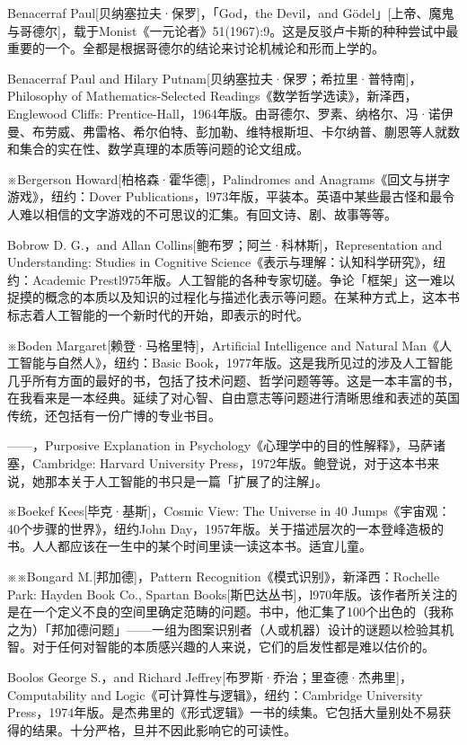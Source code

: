 \documentclass[
  12pt,
  twoside,
  openright,
  oldfontcommands,
]{memoir}
\begin{document}
Benacerraf Paul{[}贝纳塞拉夫·保罗{]}，「God，the Devil，and
Gödel」{[}上帝、魔鬼与哥德尔{]}，载于Monist《一元论者》51(1967):9。这是反驳卢卡斯的种种尝试中最重要的一个。全都是根据哥德尔的结论来讨论机械论和形而上学的。

Benacerraf Paul and Hilary
Putnam{[}贝纳塞拉夫·保罗；希拉里·普特南{]}，Philosophy of
Mathematics-Selected Readings《数学哲学选读》，新泽西，Englewood Cliffs:
Prentice-Hall，1964年版。由哥德尔、罗素、纳格尔、冯·诺伊曼、布劳威、弗雷格、希尔伯特、彭加勒、维特根斯坦、卡尔纳普、蒯恩等人就数和集合的实在性、数学真理的本质等问题的论文组成。

※Bergerson Howard{[}柏格森·霍华德{]}，Palindromes and
Anagrams《回文与拼字游戏》，纽约：Dover
Publications，l973年版，平装本。英语中某些最古怪和最令人难以相信的文字游戏的不可思议的汇集。有回文诗、剧、故事等等。

Bobrow D. G.，and Allan Collins{[}鲍布罗；阿兰·科林斯{]}，Representation
and Understanding: Studies in Cognitive
Science《表示与理解：认知科学研究》，纽约：Academic
Prestl975年版。人工智能的各种专家切磋。争论「框架」这一难以捉摸的概念的本质以及知识的过程化与描述化表示等问题。在某种方式上，这本书标志着人工智能的一个新时代的开始，即表示的时代。

※Boden Margaret{[}赖登·马格里特{]}，Artificial Intelligence and Natural
Man《人工智能与自然人》，纽约：Basic
Book，1977年版。这是我所见过的涉及人工智能几乎所有方面的最好的书，包括了技术问题、哲学问题等等。这是一本丰富的书，在我看来是一本经典。延续了对心智、自由意志等问题进行清晰思维和表述的英国传统，还包括有一份广博的专业书目。

------，Purposive Explanation in
Psychology《心理学中的目的性解释》，马萨诸塞，Cambridge: Harvard
University
Press，1972年版。鲍登说，对于这本书来说，她那本关于人工智能的书只是一篇「扩展了的注解」。

※Boekef Kees{[}毕克·基斯{]}，Cosmic View: The Universe in 40
Jumps《宇宙观：40个步骤的世界》，纽约John
Day，1957年版。关于描述层次的一本登峰造极的书。人人都应该在一生中的某个时间里读一读这本书。适宜儿童。

※※Bongard M.{[}邦加德{]}，Pattern
Recognition《模式识别》，新泽西：Rochelle Park: Hayden Book Co., Spartan
Books{[}斯巴达丛书{]}，l970年版。该作者所关注的是在一个定义不良的空间里确定范畴的问题。书中，他汇集了100个出色的（我称之为）「邦加德问题」------一组为图案识别者（人或机器）设计的谜题以检验其机智。对于任何对智能的本质感兴趣的人来说，它们的启发性都是难以估价的。

Boolos George S.，and Richard
Jeffrey{[}布罗斯·乔治；里查德·杰弗里{]}，Computability and
Logic《可计算性与逻辑》，纽约：Cambridge University
Press，1974年版。是杰弗里的《形式逻辑》一书的续集。它包括大量别处不易获得的结果。十分严格，旦并不因此影响它的可读性。
\end{document}
